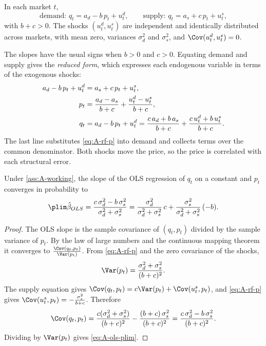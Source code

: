 \begin{assumption}\label{ass:A-working}
In each market $t$,
\begin{equation}\label{eq:A-working}
\text{demand: } q_t = a_d - b\,p_t + u^d_t, \qquad \text{supply: } q_t = a_s + c\,p_t + u^s_t ,
\end{equation}
with $b + c > 0$. The shocks $(u^d_t, u^s_t)$ are independent and identically distributed across markets,
with mean zero, variances $\sigma_d^2$ and $\sigma_s^2$, and $\Cov(u^d_t, u^s_t) = 0$.
\end{assumption}

The slopes have the usual signs when $b > 0$ and $c > 0$. Equating demand and supply gives the
\emph{reduced form}, which expresses each endogenous variable in terms of the exogenous shocks:
\begin{align}
a_d - b\,p_t + u^d_t &= a_s + c\,p_t + u^s_t , \notag\\
p_t &= \frac{a_d - a_s}{b + c} + \frac{u^d_t - u^s_t}{b + c} , \label{eq:A-rf-p}\\
q_t &= a_d - b\,p_t + u^d_t = \frac{c\,a_d + b\,a_s}{b + c} + \frac{c\,u^d_t + b\,u^s_t}{b + c} . \label{eq:A-rf-q}
\end{align}
The last line substitutes \eqref{eq:A-rf-p} into demand and collects terms over the common denominator. Both
shocks move the price, so the price is correlated with each structural error.

\begin{proposition}\label{prop:A-ols-simultaneity}
Under \cref{ass:A-working}, the slope of the OLS regression of $q_t$ on a constant and $p_t$ converges in
probability to
\begin{equation}\label{eq:A-ols-plim}
\plim \hat\beta_{OLS} = \frac{c\,\sigma_d^2 - b\,\sigma_s^2}{\sigma_d^2 + \sigma_s^2}
= \frac{\sigma_d^2}{\sigma_d^2 + \sigma_s^2}\,c + \frac{\sigma_s^2}{\sigma_d^2 + \sigma_s^2}\,(-b) .
\end{equation}
\end{proposition}

\begin{proof}
The OLS slope is the sample covariance of $(q_t, p_t)$ divided by the sample variance of $p_t$. By the law
of large numbers and the continuous mapping theorem it converges to $\frac{\Cov(q_t, p_t)}{\Var(p_t)}$. From
\eqref{eq:A-rf-p} and the zero covariance of the shocks,
\begin{equation*}
\Var(p_t) = \frac{\sigma_d^2 + \sigma_s^2}{(b + c)^2} .
\end{equation*}
The supply equation gives $\Cov(q_t, p_t) = c\Var(p_t) + \Cov(u^s_t, p_t)$, and \eqref{eq:A-rf-p} gives
$\Cov(u^s_t, p_t) = -\frac{\sigma_s^2}{b + c}$. Therefore
\begin{equation*}
\Cov(q_t, p_t) = \frac{c(\sigma_d^2 + \sigma_s^2)}{(b + c)^2} - \frac{(b + c)\,\sigma_s^2}{(b + c)^2}
= \frac{c\,\sigma_d^2 - b\,\sigma_s^2}{(b + c)^2} .
\end{equation*}
Dividing by $\Var(p_t)$ gives \eqref{eq:A-ols-plim}.
\end{proof}


